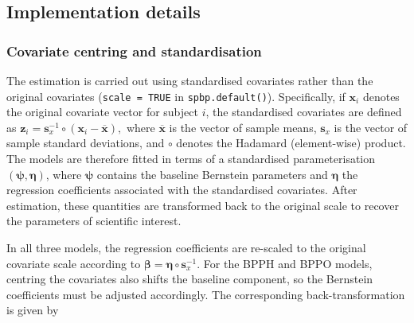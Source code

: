 \documentclass[5p,lefttitle]{elsarticle}
\begin{document}
{\subsection{Implementation details} \label{sec:implementation}

\subsubsection{Covariate centring and standardisation}\label{sec:varscale}

The estimation is carried out using standardised
covariates rather than the original covariates (\texttt{scale = TRUE} in
\texttt{spbp.default()}). Specifically, if
\(\boldsymbol{x}_i\) denotes the original covariate vector for subject
\(i\), the standardised covariates are defined as \(\boldsymbol{z}_i =
\boldsymbol{s}_x^{-1} \circ
(\boldsymbol{x}_i - \overline{\boldsymbol{x}}),\) where
\(\overline{\boldsymbol{x}}\) is the vector of sample means,
\(\boldsymbol{s}_x\) is the vector of sample standard deviations, and
\(\circ\) denotes the Hadamard (element-wise) product. The models are
therefore fitted in terms of a standardised parameterisation
\((\boldsymbol{\psi}, \boldsymbol{\eta})\), where \(\boldsymbol{\psi}\)
contains the baseline Bernstein parameters and \(\boldsymbol{\eta}\) the
regression coefficients associated with the standardised covariates.
After estimation, these quantities are transformed back to the original
scale to recover the parameters of scientific interest.

In all three models, the regression coefficients are re-scaled to the
original covariate scale according to
\(\boldsymbol{\beta} = \boldsymbol{\eta} \circ \boldsymbol{s}_x^{-1}.\)
For the BPPH and BPPO models, centring the
covariates also shifts the baseline component, so the Bernstein coefficients must be adjusted accordingly. The
corresponding back-transformation is given by

}
\end{document}
